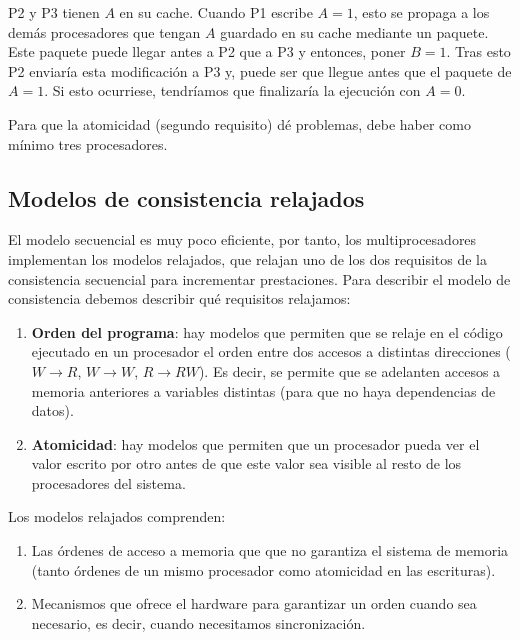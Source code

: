 \documentclass[10pt,a4paper,spanish]{report}
\begin{document}
P2 y P3 tienen $A$ en su cache. Cuando P1 escribe $A=1$, esto se propaga a los demás procesadores que tengan $A$ guardado en su cache mediante un paquete. Este paquete puede llegar antes a P2 que a P3 y entonces, poner $B=1$. Tras esto P2 enviaría esta modificación a P3 y, puede ser que llegue antes que el paquete de $A=1$. Si esto ocurriese, tendríamos que finalizaría la ejecución con $A=0$.

Para que la atomicidad (segundo requisito) dé problemas, debe haber como mínimo tres procesadores.


\textcolor[rgb]{0.2,0.4,0.8}{\subsection{Modelos de consistencia relajados}}
El modelo secuencial es muy poco eficiente, por tanto, los multiprocesadores implementan los modelos relajados, que relajan uno de los dos requisitos de la consistencia secuencial para incrementar prestaciones. Para describir el modelo de consistencia debemos describir qué requisitos relajamos:
\begin{enumerate}[\color{azul}{\bf $\heartsuit$}]
    \item \textcolor[rgb]{0.2,0.4,0.8}{\textbf{Orden del programa}}: hay modelos que permiten que se relaje en el código ejecutado en un procesador el orden entre dos accesos a distintas direcciones ($W\rightarrow R$, $W \rightarrow W$, $R \rightarrow RW$). Es decir, se permite que se adelanten accesos a memoria anteriores a variables distintas (para que no haya dependencias de datos).
    \item \textcolor[rgb]{0.2,0.4,0.8}{\textbf{Atomicidad}}: hay modelos que permiten que un procesador pueda ver el valor escrito por otro antes de que este valor sea visible al resto de los procesadores del sistema.
\end{enumerate}

Los modelos relajados comprenden:
\begin{enumerate}[\color{azul}{\bf $\heartsuit$}]
    \item Las órdenes de acceso a memoria que que no garantiza el sistema de memoria (tanto órdenes de un mismo procesador como atomicidad en las escrituras).
    \item Mecanismos que ofrece el hardware para garantizar un orden cuando sea necesario, es decir, cuando necesitamos sincronización.
\end{enumerate}
\end{document}
